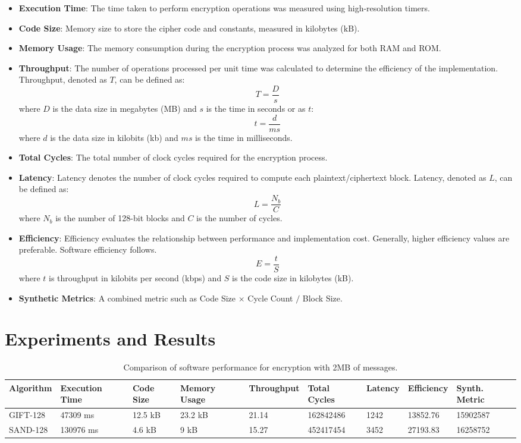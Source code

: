\documentclass[conference]{IEEEtran}
\begin{document}
\begin{itemize}
    \item \textbf{Execution Time}: The time taken to perform encryption operations was measured using high-resolution timers.
    \item \textbf{Code Size}: Memory size to store the cipher code and constants, measured in kilobytes ($\text{kB}$).
    \item \textbf{Memory Usage}: The memory consumption during the encryption process was analyzed for both RAM and ROM.
    \item \textbf{Throughput}: The number of operations processed per unit time was calculated to determine the efficiency of the implementation. Throughput, denoted as \( T \), can be defined as:
    \[ T = \frac{D}{s} \]
    where \( D \) is the data size in megabytes (MB) and \( s \) is the time in seconds or as \( t \):
    \[ t = \frac{d}{ms} \]
    where \( d \) is the data size in kilobits (kb) and \( ms \) is the time in milliseconds.
    \item \textbf{Total Cycles}: The total number of clock cycles required for the encryption process.
    \item \textbf{Latency}: Latency denotes the number of clock cycles required to compute each plaintext/ciphertext block. Latency, denoted as \( L \), can be defined as:
    \[ L = \frac{N_b}{C} \]
    where \( N_b \) is the number of 128-bit blocks and \( C \) is the number of cycles.
    \item \textbf{Efficiency}: Efficiency evaluates the relationship between performance and implementation cost. Generally, higher efficiency values are preferable. Software efficiency follows.
    \[ E = \frac{t}{S} \]
    where \( t \) is throughput in kilobits per second (kbps) and \( S \) is the code size in kilobytes (kB).
    \item \textbf{Synthetic Metrics}: A combined metric such as Code Size $\times$ Cycle Count $/$ Block Size.
\end{itemize}

\section{Experiments and Results}\label{sec:exp}

\begin{table}[ht]
  \centering
  \caption{Comparison of software performance for encryption with 2MB of messages.}
  \begin{tabular}{lllllllll} 
   \toprule
   Algorithm & Execution Time & Code Size & Memory Usage & Throughput & Total Cycles & Latency & Efficiency & Synth. Metric\\ 
   \midrule
   GIFT-128 & 47309 ms & 12.5 kB & 23.2 kB & 21.14 & 162842486 & 1242 & 13852.76 & 15902587 \\
   SAND-128 & 130976 ms & 4.6 kB & 9 kB & 15.27 & 452417454 & 3452 & 27193.83 & 16258752  \\
   \bottomrule
  \end{tabular}
  \label{table:enc}
\end{table}
\end{document}
